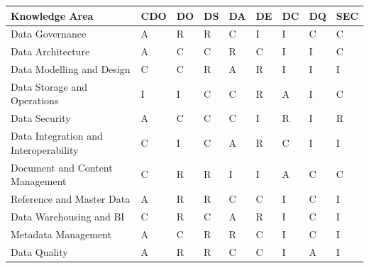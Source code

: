 \documentclass[
  letterpaper,
  DIV=11,
  numbers=noendperiod]{scrartcl}
\begin{document}
\begin{longtable}[]{@{}
  >{\raggedright\arraybackslash}p{}
  >{\raggedright\arraybackslash}p{}
  >{\raggedright\arraybackslash}p{}
  >{\raggedright\arraybackslash}p{}
  >{\raggedright\arraybackslash}p{}
  >{\raggedright\arraybackslash}p{}
  >{\raggedright\arraybackslash}p{}
  >{\raggedright\arraybackslash}p{}
  >{\raggedright\arraybackslash}p{}@{}}
\toprule\noalign{}
\begin{minipage}[b]{\linewidth}\raggedright
Knowledge Area
\end{minipage} & \begin{minipage}[b]{\linewidth}\raggedright
CDO
\end{minipage} & \begin{minipage}[b]{\linewidth}\raggedright
DO
\end{minipage} & \begin{minipage}[b]{\linewidth}\raggedright
DS
\end{minipage} & \begin{minipage}[b]{\linewidth}\raggedright
DA
\end{minipage} & \begin{minipage}[b]{\linewidth}\raggedright
DE
\end{minipage} & \begin{minipage}[b]{\linewidth}\raggedright
DC
\end{minipage} & \begin{minipage}[b]{\linewidth}\raggedright
DQ
\end{minipage} & \begin{minipage}[b]{\linewidth}\raggedright
SEC
\end{minipage} \\
\midrule\noalign{}
\endhead
\bottomrule\noalign{}
\endlastfoot
Data Governance & A & R & R & C & I & I & C & C \\
Data Architecture & A & C & C & R & C & I & I & C \\
Data Modelling and Design & C & C & R & A & R & I & I & I \\
Data Storage and Operations & I & I & C & C & R & A & I & C \\
Data Security & A & C & C & C & I & R & I & R \\
Data Integration and Interoperability & C & I & C & A & R & C & I & I \\
Document and Content Management & C & R & R & I & I & A & C & C \\
Reference and Master Data & A & R & R & C & C & I & C & I \\
Data Warehousing and BI & C & R & C & A & R & I & C & I \\
Metadata Management & A & C & R & R & C & I & C & I \\
Data Quality & A & R & R & C & C & I & A & I \\
\end{longtable}
\end{document}
